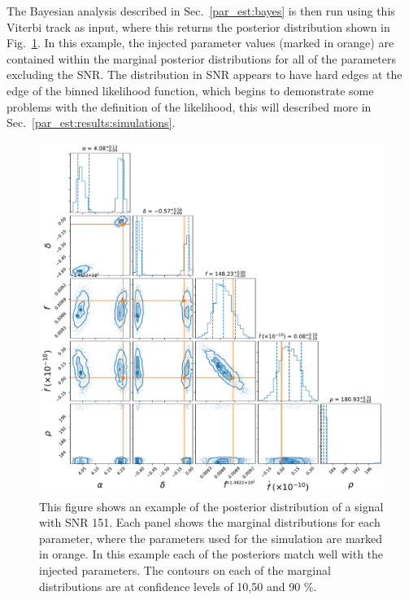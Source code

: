 The Bayesian analysis described in Sec.~\ref{par_est:bayes} is then run using
this Viterbi track as input, where this returns the posterior distribution
shown in Fig.~\ref{par_est:results:example_posterior}.  In this example, the
injected parameter values (marked in orange) are contained within the marginal
posterior distributions for all of the parameters excluding the \gls{SNR}.  The
distribution in \gls{SNR} appears to have hard edges at the edge of the binned
likelihood function, which begins to demonstrate some problems with the
definition of the likelihood, this will described more in Sec.~\ref{par_est:results:simulations}.
%
\begin{figure}[pt]
    \centering
    \includegraphics[width=\linewidth]{C5_parameter/cornerplot.pdf}
    \caption[KDE of likelihood in different \gls{SNR} ranges]{This figure shows
an example of the posterior distribution of a signal with \gls{SNR} 151. Each
panel shows the marginal distributions for each parameter, where the parameters
used for the simulation are marked in orange. In this example each of the
posteriors match well with the injected parameters.
The contours on each of the marginal distributions are at confidence levels of 10,50 and 90 \%.}
\label{par_est:results:example_posterior}    
\end{figure}
%

